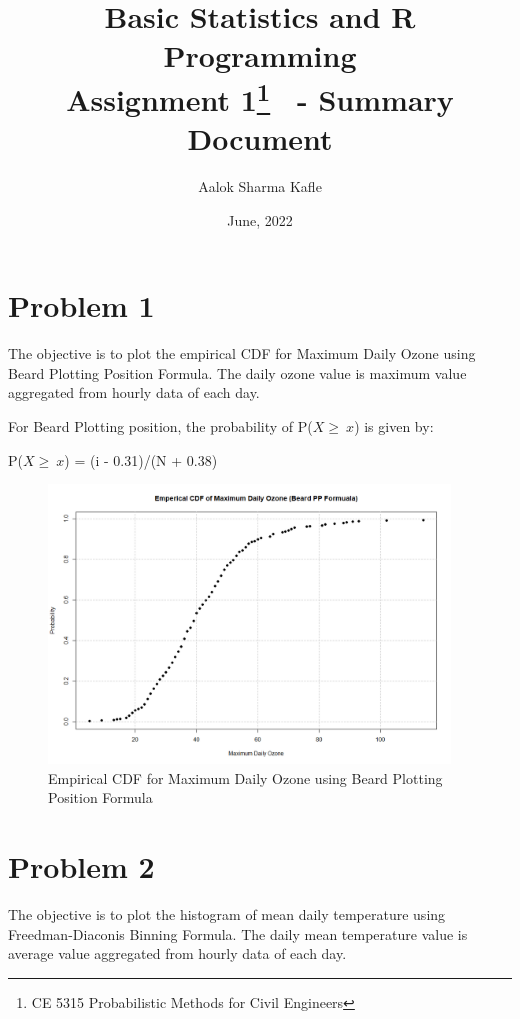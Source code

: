 \documentclass{article}%
\title{\vspace{-3.0cm} \textbf{\LARGE Basic Statistics and R Programming} \\ \Large Assignment 1\thanks{CE 5315 Probabilistic Methods for Civil Engineers} \ - Summary Document}
\date{June, 2022}
\author{\large Aalok Sharma Kafle}
\begin{document}
\maketitle

\section *{Problem 1}
The objective is to plot the empirical CDF for Maximum Daily Ozone using Beard Plotting Position Formula. The daily ozone value is maximum value aggregated from hourly data of each day. \\ \par

For Beard Plotting position, the probability of P($X \ge \ x$) is given by: \par
\begin{center}
P($X \ge \ x$) = (i - 0.31)/(N + 0.38)
\end{center}

\begin{figure} [H]
	\begin{center}
	\includegraphics[width=0.95\textwidth]{Q1CDF}
	\caption{\footnotesize Empirical CDF for Maximum Daily Ozone using Beard Plotting Position Formula}
	\end{center}
\end{figure}

\pagebreak

\section *{Problem 2}
The objective is to plot the histogram of mean daily temperature using Freedman-Diaconis Binning Formula. The daily mean temperature value is average value aggregated from hourly data of each day.
\end{document}
